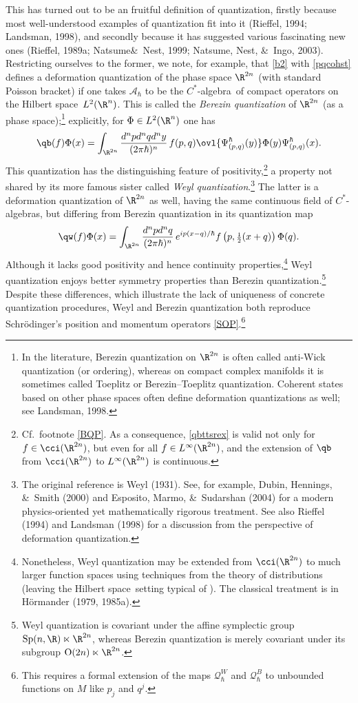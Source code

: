 \documentclass[12pt,titlepage]{article}
\newcommand{\beq}{\begin{equation}}
\newcommand{\eeq}{\end{equation}}
\newcommand{\ca}{$C^*$-algebra} \newcommand{\jba}{JB-algebra}
\newcommand{\Hs}{Hilbert space} \newcommand{\Bs}{Banach space}
\newcommand{\half}{\mbox{\footnotesize $\frac{1}{2}$}}
\newcommand{\qh}{q_{\hbar}} \newcommand{\sgh}{\sigma_{\hbar}}
\newcommand{\er}{\eqref}
\newcommand{\CA}{{\mathcal A}} \newcommand{\CB}{{\mathcal B}}
\newcommand{\CQ}{{\mathcal Q}} \newcommand{\CR}{{\mathcal R}}
\renewcommand{\qh}{\CQ_{\hbar}}
\begin{document}
 This has turned out to be an fruitful definition of quantization, firstly because most well-understood examples of quantization fit into it (Rieffel, 1994; Landsman, 1998), and secondly because it has suggested various fascinating new ones (Rieffel, 1989a; Natsume\&\  Nest, 1999; Natsume,  Nest, \&\  Ingo, 2003). Restricting ourselves to the former, we note, for example, that \er{b2} with \er{pqcohst} defines a  deformation quantization of the phase space $\R^{2n}$ (with standard Poisson bracket) if one takes $\CA_{\hbar}$ to be the \ca\ of compact operators on the \Hs\ $L^2(\R^n)$. This is called the {\it Berezin quantization} of $\R^{2n}$ (as a phase space);\footnote{ In the literature, Berezin quantization on $\R^{2n}$ is often called anti-Wick quantization (or ordering), whereas on compact complex manifolds it is sometimes called Toeplitz or
Berezin--Toeplitz quantization. Coherent states based on other phase spaces often define deformation quantizations as well; see Landsman, 1998.}
 explicitly, for $\Phi\in L^2(\R^n)$ one has
  \beq \qb(f)\Phi(x)=\int_{\R^{2n}} \frac{d^np
d^nqd^ny}{(2\pi\hbar)^n}\, f(p,q) \ovl{\Psi_{(p,q)}^{\hbar}(y)} \Phi(y) \Psi_{(p,q)}^{\hbar}(x) . \label{qbttsrex} \eeq
This quantization has the distinguishing feature of positivity,\footnote{Cf.\ footnote  \ref{BQP}. As a consequence, \er{qbttsrex} is valid not only for $f\in \cci(\R^{2n})$, but even for all $f\in L^{\infty}(\R^{2n})$, and the extension 
of $\qb$ from $\cci(\R^{2n})$ to $L^{\infty}(\R^{2n})$ is continuous.
} a property not shared by its more famous sister called {\it Weyl quantization}.\footnote{The original reference is Weyl (1931). See, for example, Dubin, Hennings, \&\ Smith (2000) 
and Esposito, Marmo, \&\ Sudarshan (2004)  
for a modern physics-oriented yet mathematically rigorous treatment. See also Rieffel (1994) and Landsman (1998) for a discussion from the perspective of deformation quantization.}
The latter is a deformation quantization of $\R^{2n}$ as well, having the same continuous field of \ca s, but differing from  Berezin quantization in its quantization map
\beq \qw(f)\Phi(x)=\int_{\R^{2n}}
 \frac{d^npd^nq}{(2\pi\hbar)^n}\, e^{ip(x-q)/\hbar}f\left(p,\half(x+q)
 \right)\Phi(q). \label{defweylq} \eeq
 Although it lacks good positivity and hence continuity properties,\footnote{Nonetheless, Weyl quantization may be extended from $\cci(\R^{2n})$ to much larger function spaces using techniques from the theory of distributions (leaving the \Hs\ setting typical of \qm). The classical treatment is in H\"{o}rmander (1979, 1985a).} 
  Weyl quantization enjoys better symmetry properties than Berezin quantization.\footnote{\label{GCQQ} Weyl quantization is covariant under the affine symplectic group $\mathrm{Sp}(n,\R)\ltimes \R^{2n}$, whereas Berezin quantization is merely covariant under its subgroup $\mathrm{O}(2n)\ltimes \R^{2n}$.} Despite these differences, which  illustrate the lack of uniqueness of concrete quantization procedures, Weyl and Berezin quantization both reproduce Schr\"{o}dinger's position and momentum operators \er{SOP}.\footnote{This requires a formal extension of the maps $\qh^W$ and $\qh^B$ to unbounded functions on $M$ like $p_j$ and $q^j$.}  
\end{document}
